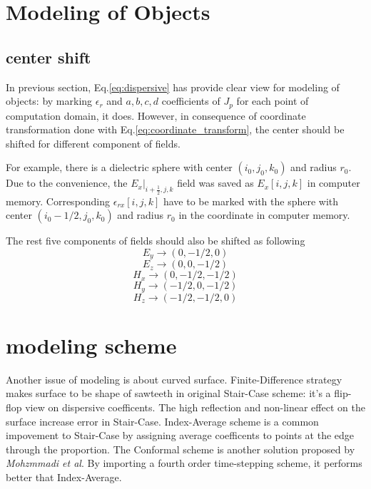 \section{Modeling of Objects}
\label{sec:modeling}

\subsection{center shift}
In previous section, Eq.\ref{eq:dispersive} has provide clear view for modeling of objects: by marking $\epsilon_r$ and
$a, b, c,d$ coefficients of $J_p$ for each point of computation domain, it does. However, in consequence of coordinate
transformation done with Eq.\ref{eq:coordinate_transform}, the center should be shifted for different component of
fields.

For example, there is a dielectric sphere with center $(i_0,j_0,k_0)$ and radius $r_0$. Due to the convenience, the
$E_x|_{i+\frac{1}{2},j,k}$ field was saved as $E_x[i,j,k]$ in computer memory. Corresponding $\epsilon_{rx}[i,j,k]$ have
to be marked with the sphere with center $(i_0-1/2, j_0, k_0)$ and radius $r_0$ in the coordinate in computer memory.

The rest five components of fields should also be shifted as following
\begin{displaymath}
  E_y \rightarrow (0,-1/2,0)
\end{displaymath}
\begin{displaymath}
  E_z \rightarrow (0,0,-1/2)
\end{displaymath}
\begin{displaymath}
  H_x \rightarrow (0,-1/2,-1/2)
\end{displaymath}
\begin{displaymath}
  H_y \rightarrow (-1/2,0,-1/2)
\end{displaymath}
\begin{displaymath}
  H_z \rightarrow (-1/2,-1/2,0)
\end{displaymath}

\section{modeling scheme}
Another issue of modeling is about curved surface. Finite-Difference strategy makes surface to be shape of sawteeth in
original Stair-Case scheme: it's a flip-flop view on dispersive coefficents. The high reflection and non-linear effect
on the surface increase error in Stair-Case. Index-Average scheme is a common impovement to Stair-Case by assigning
average coefficents to points at the edge through the proportion. The Conformal scheme is another solution proposed by
\textit{Mohzmmadi et al}. By importing a fourth order time-stepping scheme, it performs better that Index-Average.


